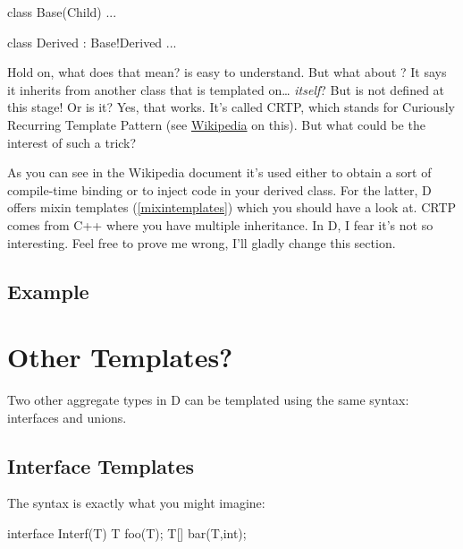 \begin{dcode}
class Base(Child) { ... }

class Derived : Base!Derived { ... }
\end{dcode}

Hold on, what does that mean?  is easy to understand. But what about ? It says it inherits from another class that is templated on\ldots {} \emph{itself}? But  is not defined at this stage! Or is it? 
Yes, that works. It's called CRTP, which stands for Curiously Recurring Template Pattern (see \href{ http://en.wikipedia.org/wiki/Curiously_recurring_template_pattern}{Wikipedia} on this). But what could be the interest of such a trick?

As you can see in the Wikipedia document it's used either to obtain a sort of compile-time binding or to inject code in your derived class. For the latter, D offers mixin templates (\ref{mixintemplates}) which you should have a look at. CRTP comes from C++ where you have multiple inheritance. In D, I fear it's not so interesting. Feel free to prove me wrong, I'll gladly change this section.

\subsection{Example}



\section{Other Templates?}\label{othertemplates}

Two other aggregate types in D can be templated using the same syntax: interfaces and unions.

\subsection{Interface Templates}

The syntax is exactly what you might imagine: 

\begin{dcode}
interface Interf(T)
{
    T foo(T);
    T[] bar(T,int);
}
\end{dcode}

